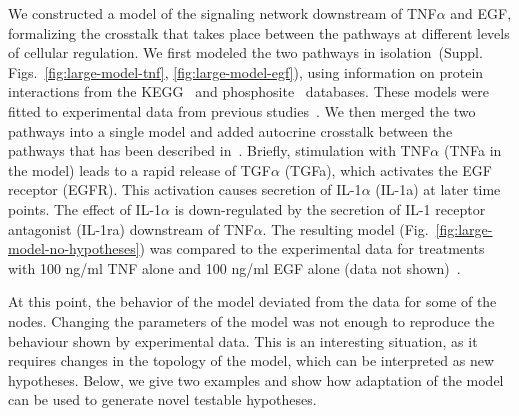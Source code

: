 \documentclass{bmcart}
\begin{document}
We constructed a model of the signaling network downstream of TNF$\alpha$ and EGF, formalizing
the crosstalk that takes place between the pathways at different levels of cellular regulation.
We first modeled the two pathways in isolation~(Suppl. Figs.~\ref{fig:large-model-tnf}, \ref{fig:large-model-egf}),
using information on protein interactions from
the KEGG~\cite{kegg} and phosphosite~\cite{phosphosite} databases. These models were fitted to experimental data
from previous studies~\cite{pathway-compendium,pathway-autocrine}.
We then merged the two pathways into a single model and added autocrine crosstalk between the pathways that has been
described in~\cite{pathway-autocrine}.
Briefly, stimulation with TNF$\alpha$ ({\sf TNFa} in the model) leads to a rapid release of TGF$\alpha$ ({\sf TGFa}),
which activates the EGF receptor ({\sf EGFR}).
This activation causes secretion of IL-1$\alpha$ ({\sf IL-1a}) at later time points.
The effect of IL-1$\alpha$ is down-regulated by the secretion of IL-1 receptor antagonist ({\sf IL-1ra})
downstream of TNF$\alpha$.
The resulting model (Fig.~\ref{fig:large-model-no-hypotheses}) was compared to the experimental data
for treatments with 100 ng/ml TNF alone and 100 ng/ml EGF alone (data not shown)~\cite{pathway-compendium}.

At this point, the behavior of the model deviated from the data for some of the nodes.
Changing the parameters of the model was not enough to reproduce the behaviour shown by experimental
data. This is an interesting situation, as it requires changes in the topology of
the model, which can be interpreted as new hypotheses. Below, we give two examples and show how
adaptation of the model can be used to generate novel testable hypotheses.
\end{document}
